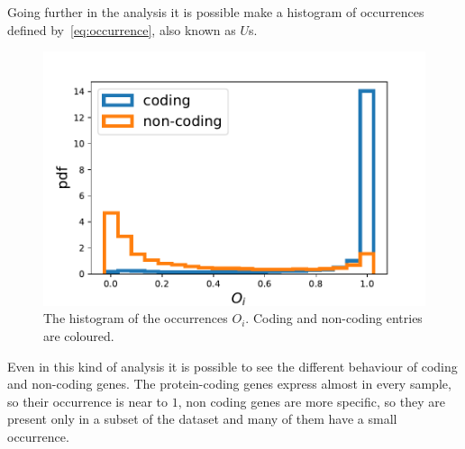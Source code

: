 Going further in the analysis it is possible make a histogram of occurrences defined by~\ref{eq:occurrence}, also known as $U$s.
\begin{figure}[htb!]
    \centering
    \includegraphics[width=0.9\linewidth]{pictures/structure/gtex/U_gtex_cnc.pdf}
    \caption{The histogram of the occurrences $O_i$. Coding and non-coding entries are coloured.}
    \label{fig:structure/gtex/U_cnc}
\end{figure}
Even in this kind of analysis it is possible to see the different behaviour of coding and non-coding genes. The protein-coding genes express almost in every sample, so their occurrence is near to $1$, non coding genes are more specific, so they are present only in a subset of the dataset and many of them have a small occurrence.
